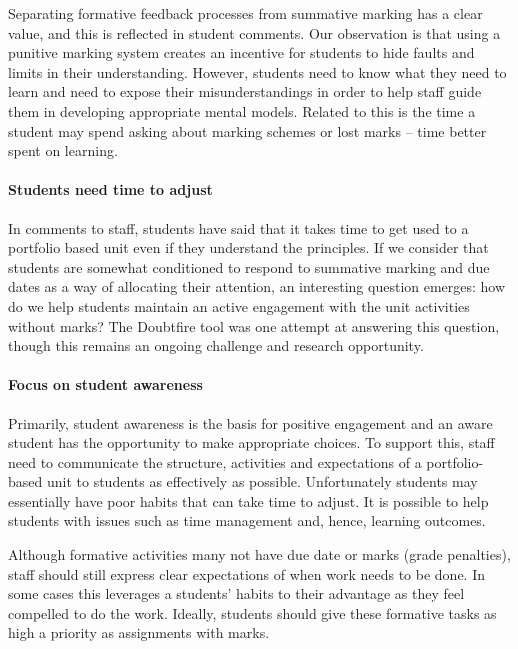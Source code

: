 Separating formative feedback processes from summative marking has a clear value, and this is reflected in student comments. Our observation is that using a punitive marking system creates an incentive for students to hide faults and limits in their understanding. However, students need to know what they need to learn and need to expose their misunderstandings in order to help staff guide them in developing appropriate mental models. Related to this is the time a student may spend asking about marking schemes or lost marks -- time better spent on learning.

\paragraph{Students need time to adjust}

In comments to staff, students have said that it takes time to get used to a portfolio based unit even if they understand the principles. If we consider that students are somewhat conditioned to respond to summative marking and due dates as a way of allocating their attention, an interesting question emerges: how do we help students maintain an active engagement with the unit activities without marks? The Doubtfire tool was one attempt at answering this question, though this remains an ongoing challenge and research opportunity.
 
\paragraph{Focus on student awareness}
 
Primarily, student awareness is the basis for positive engagement and an aware student has the opportunity to make appropriate choices. To support this, staff need to communicate the structure, activities and expectations of a portfolio-based unit to students as effectively as possible. Unfortunately students may essentially have poor habits that can take time to adjust. It is possible to help students with issues such as time management and, hence, learning outcomes.

Although formative activities many not have due date or marks (grade penalties), staff should still express clear expectations of when work needs to be done. In some cases this leverages a students' habits to their advantage as they feel compelled to do the work. Ideally, students should give these formative tasks as high a priority as assignments with marks.

